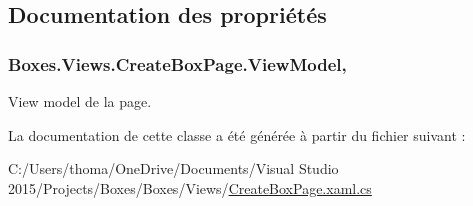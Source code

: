 \subsection{Documentation des propriétés}
\subsubsection[{\texorpdfstring{View\+Model}{ViewModel}}]{ Boxes.\+Views.\+Create\+Box\+Page.\+View\+Model\hspace{0.3cm}{\ttfamily [get]}, {\ttfamily [private]}}\hypertarget{class_boxes_1_1_views_1_1_create_box_page_a6fbc68e062cf70c1878f9e456fdd64d6}{}\label{class_boxes_1_1_views_1_1_create_box_page_a6fbc68e062cf70c1878f9e456fdd64d6}


View model de la page. 



La documentation de cette classe a été générée à partir du fichier suivant \+:\begin{DoxyCompactItemize}
\item 
C\+:/\+Users/thoma/\+One\+Drive/\+Documents/\+Visual Studio 2015/\+Projects/\+Boxes/\+Boxes/\+Views/\hyperlink{_create_box_page_8xaml_8cs}{Create\+Box\+Page.\+xaml.\+cs}\end{DoxyCompactItemize}
